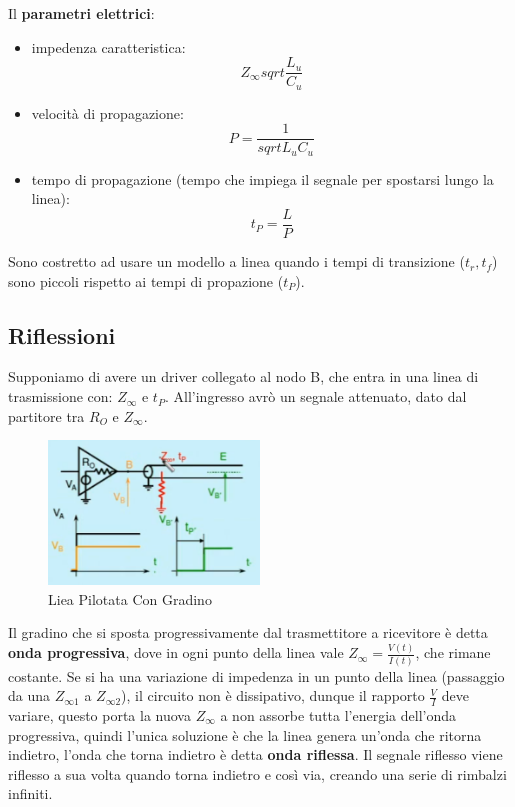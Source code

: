 \documentclass[12pt]{article}
\begin{document}
Il \textbf{parametri elettrici}:
\begin{itemize}
    \item impedenza caratteristica:
        \[ Z _{\infty} sqrt{\frac{L_u}{C_u} } \]
    \item velocit\`a di propagazione:
        \[ P = \frac{1}{sqrt{L_uC_u}}  \]
    \item tempo di propagazione (tempo che impiega il segnale per spostarsi lungo la linea):
        \[ t_P = \frac{L}{P}  \]
\end{itemize}

Sono costretto ad usare un modello a linea quando i tempi di transizione ($t_r, t_f$) sono piccoli rispetto ai tempi di propazione ($t_P$).


\subsection{Riflessioni}
Supponiamo di avere un driver collegato al nodo B, che entra in una linea di trasmissione con: $Z _{\infty}$ e $t_P$. All'ingresso avr\`o un segnale attenuato, dato dal partitore tra $R_O$ e $Z _{\infty}$.
\begin{figure}[H]
    \centering
    \includegraphics[width=0.5\textwidth]{liea-pilotata-con-gradino.png}
    \caption{Liea Pilotata Con Gradino}
    \label{fig:liea-pilotata-con-gradino}
\end{figure}

Il gradino che si sposta progressivamente dal trasmettitore a ricevitore \`e detta \textbf{onda progressiva}, dove in ogni punto della linea vale $Z _{\infty} = \frac{V(t)}{I(t)} $, che rimane costante. Se si ha una variazione di impedenza in un punto della linea (passaggio da una $Z _{\infty1}$ a $Z _{\infty2}$), il circuito non \`e dissipativo, dunque il rapporto $\frac{V}{I}$ deve variare, questo porta la nuova $Z _{\infty}$ a non assorbe tutta l'energia dell'onda progressiva, quindi l'unica soluzione \`e che la linea genera un'onda che ritorna indietro, l'onda che torna indietro \`e detta \textbf{onda riflessa}. Il segnale riflesso viene riflesso a sua volta quando torna indietro e cos\`i via, creando una serie di rimbalzi infiniti.
\end{document}
